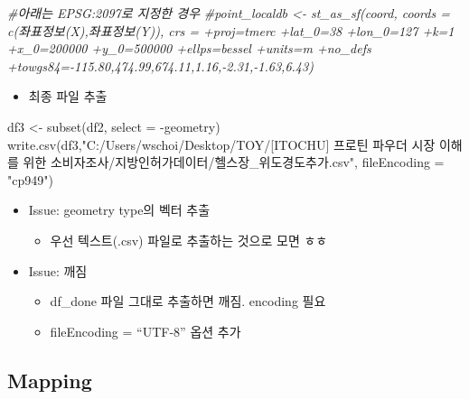 \documentclass[
]{book}
\newenvironment{Shaded}{\begin{snugshade}}{\end{snugshade}}
\newcommand{\AttributeTok}[1]{\textcolor[rgb]{0.77,0.63,0.00}{#1}}
\newcommand{\CommentTok}[1]{\textcolor[rgb]{0.56,0.35,0.01}{\textit{#1}}}
\newcommand{\FunctionTok}[1]{\textcolor[rgb]{0.00,0.00,0.00}{#1}}
\newcommand{\NormalTok}[1]{#1}
\newcommand{\OtherTok}[1]{\textcolor[rgb]{0.56,0.35,0.01}{#1}}
\newcommand{\SpecialCharTok}[1]{\textcolor[rgb]{0.00,0.00,0.00}{#1}}
\newcommand{\StringTok}[1]{\textcolor[rgb]{0.31,0.60,0.02}{#1}}
\providecommand{\tightlist}{%
  \setlength{\itemsep}{0pt}\setlength{\parskip}{0pt}}
\begin{document}
\begin{Shaded}
\begin{Highlighting}[]
\CommentTok{\#아래는 EPSG:2097로 지정한 경우}
\CommentTok{\#point\_localdb \textless{}{-} st\_as\_sf(coord, coords = c(\textquotesingle{}좌표정보(X)\textquotesingle{},\textquotesingle{}좌표정보(Y)\textquotesingle{}), crs = \textquotesingle{}+proj=tmerc +lat\_0=38 +lon\_0=127 +k=1 +x\_0=200000 +y\_0=500000 +ellps=bessel +units=m +no\_defs +towgs84={-}115.80,474.99,674.11,1.16,{-}2.31,{-}1.63,6.43\textquotesingle{})}
\end{Highlighting}
\end{Shaded}

\begin{itemize}
\tightlist
\item
  최종 파일 추출
\end{itemize}

\begin{Shaded}
\begin{Highlighting}[]
\NormalTok{df3 }\OtherTok{\textless{}{-}} \FunctionTok{subset}\NormalTok{(df2, }\AttributeTok{select =} \SpecialCharTok{{-}}\NormalTok{geometry)}
\FunctionTok{write.csv}\NormalTok{(df3,}\StringTok{"C:/Users/wschoi/Desktop/TOY/[ITOCHU] 프로틴 파우더 시장 이해를 위한 소비자조사/지방인허가데이터/헬스장\_위도경도추가.csv"}\NormalTok{, }\AttributeTok{fileEncoding =} \StringTok{"cp949"}\NormalTok{)}
\end{Highlighting}
\end{Shaded}

\begin{itemize}
\item
  Issue: geometry type의 벡터 추출

  \begin{itemize}
  \tightlist
  \item
    우선 텍스트(.csv) 파일로 추출하는 것으로 모면 ㅎㅎ
  \end{itemize}
\item
  Issue: 깨짐

  \begin{itemize}
  \item
    df\_done 파일 그대로 추출하면 깨짐. encoding 필요
  \item
    fileEncoding = ``UTF-8'' 옵션 추가
  \end{itemize}
\end{itemize}

\hypertarget{mapping}{%
\subsection{Mapping}\label{mapping}}
\end{document}
